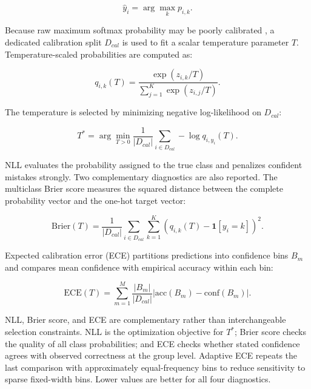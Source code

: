 \documentclass{ieeeaccess}
\begin{document}
\begin{equation}
\hat{y}_i = \arg\max_k p_{i,k}.
\end{equation}

Because raw maximum softmax probability may be poorly calibrated \cite{ref15}, a dedicated calibration split $D_{cal}$ is used to fit a scalar temperature parameter $T$. Temperature-scaled probabilities are computed as:

\begin{equation}
q_{i,k}(T)=
\frac{\exp(z_{i,k}/T)}
{\sum_{j=1}^{K}\exp(z_{i,j}/T)}.
\end{equation}

The temperature is selected by minimizing negative log-likelihood on $D_{cal}$:

\begin{equation}
T^*=\arg\min_{T>0}
\frac{1}{|D_{cal}|}\sum_{i\in D_{cal}} -\log q_{i,y_i}(T).
\label{eq:temperature-nll}
\end{equation}

NLL evaluates the probability assigned to the true class and penalizes confident mistakes strongly. Two complementary diagnostics are also reported. The multiclass Brier score measures the squared distance between the complete probability vector and the one-hot target vector:

\begin{equation}
\mathrm{Brier}(T)=\frac{1}{|D_{cal}|}
\sum_{i\in D_{cal}}\sum_{k=1}^{K}
\left(q_{i,k}(T)-\mathbf{1}[y_i=k]\right)^2.
\label{eq:brier}
\end{equation}

Expected calibration error (ECE) partitions predictions into confidence bins $B_m$ and compares mean confidence with empirical accuracy within each bin:

\begin{equation}
\mathrm{ECE}(T)=\sum_{m=1}^{M}\frac{|B_m|}{|D_{cal}|}
\left|\mathrm{acc}(B_m)-\mathrm{conf}(B_m)\right|.
\label{eq:ece}
\end{equation}

NLL, Brier score, and ECE are complementary rather than interchangeable selection constraints. NLL is the optimization objective for $T^*$; Brier score checks the quality of all class probabilities; and ECE checks whether stated confidence agrees with observed correctness at the group level. Adaptive ECE repeats the last comparison with approximately equal-frequency bins to reduce sensitivity to sparse fixed-width bins. Lower values are better for all four diagnostics.
\end{document}
